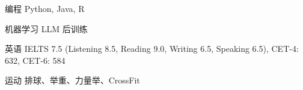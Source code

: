 

\begin{cvskills}

  \cvskill
    {编程}
    {Python, Java, R}

  \cvskill
    {机器学习}
    {LLM 后训练}

  \cvskill
    {英语}
    {IELTS 7.5 (Listening 8.5, Reading 9.0, Writing 6.5, Speaking 6.5), CET-4: 632, CET-6: 584}

  \cvskill
    {运动}
    {排球、举重、力量举、CrossFit}

\end{cvskills}
